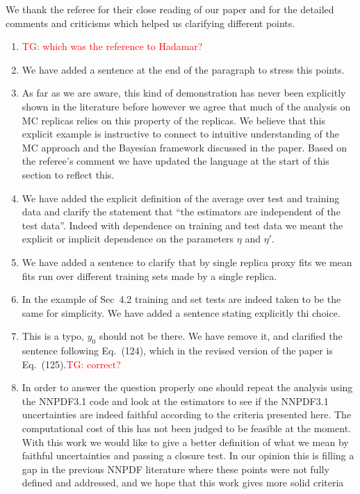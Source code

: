 \documentclass[11pt,a4paper]{article}
\numberwithin{equation}{section}
\numberwithin{figure}{section}
\numberwithin{table}{section}
\begin{document}
We thank the referee for their close reading of our paper and for the detailed comments and criticisms 
which helped us clarifying different points.
\begin{enumerate}
    \item \textcolor{red}{TG: which was the reference to Hadamar?}
    \item We have added a sentence at the end of the paragraph to stress this points.
    \item As far as we are aware, this kind of demonstration has never been explicitly
    shown in the literature before however we agree that much of the analysis on
    MC replicas relies on this property of the replicas. We believe that this explicit example
    is instructive to connect to intuitive understanding of the MC approach and
    the Bayesian framework discussed in the paper. Based on the referee's comment
    we have updated the language at the start of this section to reflect this.
    \item We have added the explicit definition of the average over test and training data and 
    clarify the statement that ``the estimators are independent of the test data''. Indeed with dependence
    on training and test data we meant the explicit or implicit dependence on the parameters $\eta$ and $\eta'$.
    \item We have added a sentence to clarify that by single replica proxy fits we mean fits
    run over different training sets made by a single replica. 
    \item In the example of Sec~4.2 training and set tests are indeed taken to be the same for simplicity.
    We have added a sentence stating explicitly thi choice.
    \item This is a typo, $y_0$ should not be there. We have remove it, and clarified the sentence following Eq.~(124),
    which in the revised version of the paper is Eq.~(125).\textcolor{red}{TG: correct?}
    \item In order to answer the question properly one should repeat the analysis using the 
    NNPDF3.1 code and look at the estimators to see if the NNPDF3.1 uncertainties are indeed faithful according to 
    the criteria presented here.
    The computational cost of this has not been judged to be feasible at the moment.
    With this work we would like to give a better definition of what we mean by faithful 
    uncertainties and passing a closure test.
    In our opinion this is filling a gap in the previous NNPDF literature where these points 
    were not fully defined and addressed, and we hope that this work gives more solid criteria 

\end{enumerate}
\end{document}
